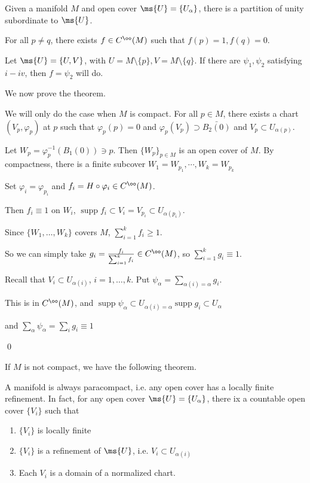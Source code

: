 \documentclass[x11names,reqno,14pt]{extarticle}
\renewcommand{\phi}{\varphi}
\DeclareMathOperator{\supp}{supp}
\begin{document}
\thm[Existence of P.O.U]

Given a manifold $M$ and open cover $\ms{U} = \{U_\alpha\}$, there is a partition of unity subordinate to $\ms{U}$.


For all $p\neq q$, there exists $f\in C^\oo(M)$ such that $f(p) = 1, f(q) = 0$. 

Let $\ms{U} = \{U, V\}$, with $U = M\setminus\{p\},V = M\setminus\{q\}$. If there are $\psi_1,\psi_2$ satisfying $i-iv$, then $f = \psi_2$ will do. 

\proof

We now prove the theorem. 

We will only do the case when $M$ is compact. For all $p \in M$, there exists a chart $(V_p,\phi_p)$ at $p$ such that $\phi_p(p) = 0$ and $\phi_p(V_p) \supset \bar{B_2(0)}$ and $V_p \subset U_{\alpha(p)}$. 

Let $W_p = \phi_p^{-1}(B_1(0)) \ni p$. Then $\{W_p\}_{p\in M}$ is an open cover of $M$. By compactness, there is a finite subcover $W_1 = W_{p_1}, \cdots, W_k = W_{p_k}$

Set $\phi_i = \phi_{p_i}$ and $f_i = H\circ\phi_i\in C^\oo(M)$. 

Then $f_i\equiv1$ on $W_i$, $\supp f_i \subset V_i = V_{p_i} \subset U_{\alpha(p_i)}$. 

Since $\{W_1,\dots,W_k\}$ covers $M$, $\sum_{i=1}^k f_i \geq 1$. 

So we can simply take $g_i = \frac{f_i}{\sum_{i=1}^kf_i}\in C^\oo(M)$, so $\sum_{i=1}^kg_i \equiv 1$. 

Recall that $V_i \subset U_{\alpha(i)}$, $i = 1, \dots, k$. Put $\psi_\alpha = \sum_{\alpha(i) = \alpha}g_i$. 

This is in $C^\oo(M)$, and $\supp\psi_\alpha \subset U_{\alpha(i) = \alpha}\supp g_i \subset U_\alpha$

and $\sum_\alpha\psi_\alpha = \sum_ig_i \equiv 1$

\qed

If $M$ is not compact, we have the following theorem. 

\thm

A manifold is always paracompact, i.e. any open cover has a locally finite refinement. In fact, for any open cover $\ms{U} = \{U_\alpha\}$, there ix a countable open cover $\{V_i\}$ such that
\begin{enumerate}[label=(\roman*)]

\item $\{V_i\}$ is locally finite

\item $\{V_i\}$ is a refinement of $\ms{U}$, i.e. $V_i \subset U_{\alpha(i)}$ 

\item Each $V_i$ is a domain of a normalized chart.

\end{enumerate}
\end{document}
